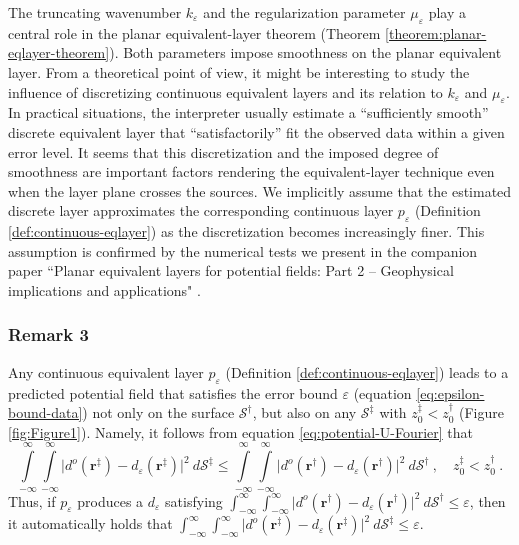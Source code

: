 The truncating wavenumber $k_{\varepsilon}$ and the regularization parameter $\mu_{\varepsilon}$ 
play a central role in the planar equivalent-layer theorem (Theorem \ref{theorem:planar-eqlayer-theorem}). 
Both parameters impose smoothness on the planar equivalent layer. 
From a theoretical point of view, it might be interesting to study the influence of
discretizing continuous equivalent layers and its relation to $k_{\varepsilon}$ and $\mu_{\varepsilon}$. 
In practical situations, the interpreter usually estimate a ``sufficiently smooth'' discrete equivalent layer 
that ``satisfactorily'' fit the observed data within a given error level. 
It seems that this discretization and the imposed degree of smoothness are important factors rendering 
the equivalent-layer technique even when the layer plane crosses the sources.
We implicitly assume that the estimated discrete layer 
approximates the corresponding continuous layer $p_{\varepsilon}$ (Definition \ref{def:continuous-eqlayer}) 
as the discretization becomes increasingly finer. 
This assumption is confirmed by the numerical tests we present in the companion paper 
``Planar equivalent layers for potential fields: Part 2 -- Geophysical implications and applications" .

\subsubsection{Remark 3}

Any continuous equivalent layer $p_{\varepsilon}$ (Definition \ref{def:continuous-eqlayer}) leads to a predicted 
potential field that satisfies
the error bound $\varepsilon$ (equation \ref{eq:epsilon-bound-data}) not only on the surface $\mathcal{S}^{\dagger}$, but also 
on any $\mathcal{S}^{\ddagger}$ with $z^{\ddagger}_{0} < z^{\dagger}_{0}$ (Figure \ref{fig:Figure1}). 
Namely, it follows from equation \ref{eq:potential-U-Fourier} that
\begin{equation}
	\int\limits_{-\infty}^{\infty} \int\limits_{-\infty}^{\infty}
	\vert d^{o}(\mathbf{r}^{\ddagger}) - d_{\varepsilon}(\mathbf{r}^{\ddagger})
	\vert^{2} \: d\mathcal{S}^{\ddagger} \le
	\int\limits_{-\infty}^{\infty} \int\limits_{-\infty}^{\infty}
	\vert d^{o}(\mathbf{r}^{\dagger}) - d_{\varepsilon}(\mathbf{r}^{\dagger})
	\vert^{2} \: d\mathcal{S}^{\dagger} \: ,
	\quad z^{\ddagger}_{0} < z^{\dagger}_{0} \: .
	\label{eq:error-bound-upper-planes}
\end{equation}
Thus, if $p_{\varepsilon}$ produces a $d_{\varepsilon}$ satisfying 
$\int_{-\infty}^{\infty} \int_{-\infty}^{\infty} \vert d^{o}(\mathbf{r}^{\dagger}) - d_{\varepsilon}(\mathbf{r}^{\dagger}) 
\vert^{2} \: d\mathcal{S}^{\dagger} \le \varepsilon$, then it automatically holds that 
$\int_{-\infty}^{\infty} \int_{-\infty}^{\infty} \vert d^{o}(\mathbf{r}^{\ddagger}) - d_{\varepsilon}(\mathbf{r}^{\ddagger}) 
\vert^{2} \: d\mathcal{S}^{\ddagger} \le \varepsilon$.

